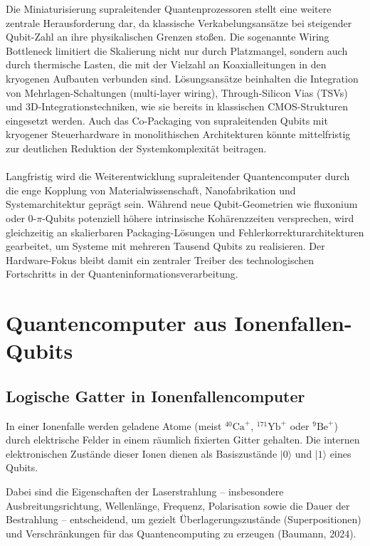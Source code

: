 Die Miniaturisierung supraleitender Quantenprozessoren stellt eine weitere zentrale Herausforderung dar, da klassische Verkabelungsansätze bei steigender Qubit-Zahl an ihre physikalischen Grenzen stoßen. Die sogenannte \grqq Wiring Bottleneck\grqq{} limitiert die Skalierung nicht nur durch Platzmangel, sondern auch durch thermische Lasten, die mit der Vielzahl an Koaxialleitungen in den kryogenen Aufbauten verbunden sind. Lösungsansätze beinhalten die Integration von Mehrlagen-Schaltungen (multi-layer wiring), Through-Silicon Vias (TSVs) und 3D-Integrationstechniken, wie sie bereits in klassischen CMOS-Strukturen eingesetzt werden. Auch das Co-Packaging von supraleitenden Qubits mit kryogener Steuerhardware in monolithischen Architekturen könnte mittelfristig zur deutlichen Reduktion der Systemkomplexität beitragen.\\\\
Langfristig wird die Weiterentwicklung supraleitender Quantencomputer durch die enge Kopplung von Materialwissenschaft, Nanofabrikation und Systemarchitektur geprägt sein. Während neue Qubit-Geometrien wie fluxonium oder 0-$\pi$-Qubits potenziell höhere intrinsische Kohärenzzeiten versprechen, wird gleichzeitig an skalierbaren Packaging-Lösungen und Fehlerkorrekturarchitekturen gearbeitet, um Systeme mit mehreren Tausend Qubits zu realisieren. Der Hardware-Fokus bleibt damit ein zentraler Treiber des technologischen Fortschritts in der Quanteninformationsverarbeitung.
\section{Quantencomputer aus Ionenfallen-Qubits}
\subsection{Logische Gatter in Ionenfallencomputer}

In einer Ionenfalle werden geladene Atome (meist \( ^{40}\mathrm{Ca}^+ \), \( ^{171}\mathrm{Yb}^+ \) oder \( ^{9}\mathrm{Be}^+ \)) durch elektrische Felder in einem räumlich fixierten Gitter gehalten. Die internen elektronischen Zustände dieser Ionen dienen als Basiszustände \( \lvert 0 \rangle \) und \( \lvert 1 \rangle \) eines Qubits. 

Dabei sind die Eigenschaften der Laserstrahlung – insbesondere Ausbreitungsrichtung, Wellenlänge, Frequenz, Polarisation sowie die Dauer der Bestrahlung – entscheidend, um gezielt Überlagerungszustände (Superpositionen) und Verschränkungen für das Quantencomputing zu erzeugen (Baumann, 2024). 

